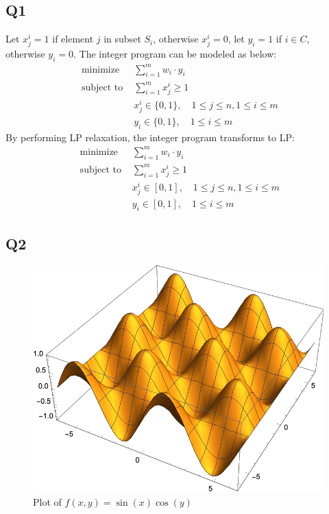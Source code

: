 \documentclass[a4paper, 12pt, titlepage]{article}
\begin{document}
\subsection{Q1}
Let $x_{j}^{i} = 1$ if element $j$ in subset $S_{i}$, otherwise $x_{j}^{i} = 0$, let $y_{i} = 1$ if $i \in C$, otherwise $y_{i} = 0$.
The integer program can be modeled as below:
\begin{equation}
	\begin{aligned}
		\text{ minimize } & \sum_{i = 1}^{m} w_{i} \cdot y_{i} \\ 
		\text{ subject to } & \sum_{i = 1}^{m} x_{j}^{i} \geq 1 \\
		& x_{j}^{i} \in\{0,1\}, \quad 1 \leq j \leq n, 1 \leq i \leq m \\
		& y_{i} \in\{0,1\}, \quad 1 \leq i \leq m
	\end{aligned}
\end{equation}
By performing LP relaxation, the integer program transforms to LP:
\begin{equation}
	\begin{aligned}
		\text{ minimize } & \sum_{i = 1}^{m} w_{i} \cdot y_{i} \\ 
		\text{ subject to } & \sum_{i = 1}^{m} x_{j}^{i} \geq 1 \\
		& x_{j}^{i} \in [0,1], \quad 1 \leq j \leq n, 1 \leq i \leq m \\
		& y_{i} \in [0,1], \quad 1 \leq i \leq m
	\end{aligned}
\end{equation}

\subsection{Q2}
\begin{figure} 
    \includegraphics{example.pdf}
    \caption{Plot of $f(x,y)=\sin(x)\cos(y)$}
    \centering
\end{figure}
\end{document}
